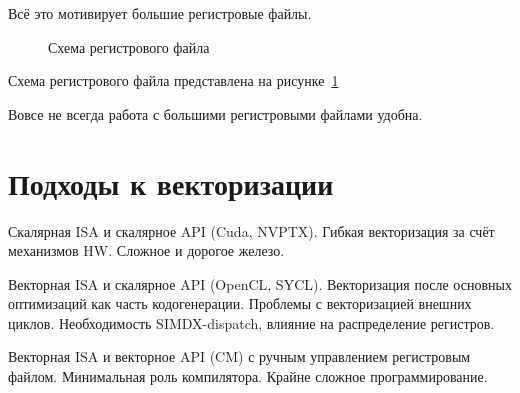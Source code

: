 Всё это мотивирует большие регистровые файлы.

\begin{figure}[ht]
    \caption{Схема регистрового файла}\label{fig:genisa-addressing-base}
\end{figure}

Схема регистрового файла представлена на рисунке~\cref{fig:genisa-addressing-base}

Вовсе не всегда работа с большими регистровыми файлами удобна.

\section{Подходы к векторизации}\label{sec:overview/vectorizing}

Скалярная ISA и скалярное API (Cuda, NVPTX). Гибкая векторизация за счёт механизмов HW.
Сложное и дорогое железо.

Векторная ISA и скалярное API (OpenCL, SYCL). Векторизация после основных оптимизаций как часть кодогенерации.
Проблемы с векторизацией внешних циклов.
Необходимость SIMDX-dispatch, влияние на распределение регистров.

Векторная ISA и векторное API (CM) с ручным управлением регистровым файлом.
Минимальная роль компилятора.
Крайне сложное программирование.


\FloatBarrier
